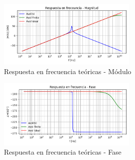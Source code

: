 \begin{figure}[H]
    \centering
    \includegraphics[width=0.6\textwidth]{../Ejercicio3-CircuitoIntegradoresyDerivadores/Imagenes/Derivador/bode_derivador_magnitud.png}
    \caption{Respuesta en frecuencia teóricas - Módulo}
\end{figure}
\begin{figure}[H]
    \centering
    \includegraphics[width=0.6\textwidth]{../Ejercicio3-CircuitoIntegradoresyDerivadores/Imagenes/Derivador/bode_derivador_fase.png}
    \caption{Respuesta en frecuencia teóricas - Fase}
\end{figure}

